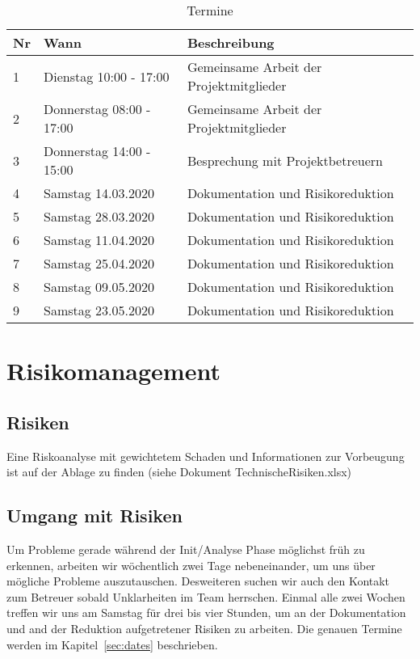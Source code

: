 \documentclass[
	ngerman,
	toc=listof, %
	toc=bibliography, %
	footnotes=multiple, %
	parskip=half, %
	numbers=noendperiod %
]{scrartcl}
\begin{document}
		\begin{table}[!h]
			\begin{tabularx}{0.9 \linewidth}{llX}
				\toprule
				Nr & Wann & Beschreibung \\
				\midrule
				1 & Dienstag 10:00 - 17:00 & Gemeinsame Arbeit der Projektmitglieder \\
				2 & Donnerstag 08:00 - 17:00 & Gemeinsame Arbeit der Projektmitglieder \\
				3 & Donnerstag 14:00 - 15:00 & Besprechung mit Projektbetreuern \\
				4 & Samstag 14.03.2020 & Dokumentation und Risikoreduktion\\
				5 & Samstag 28.03.2020 & Dokumentation und Risikoreduktion\\
				6 & Samstag 11.04.2020 & Dokumentation und Risikoreduktion\\
				7 & Samstag 25.04.2020 & Dokumentation und Risikoreduktion\\
				8 & Samstag 09.05.2020 & Dokumentation und Risikoreduktion\\
				9 & Samstag 23.05.2020 & Dokumentation und Risikoreduktion\\

				\bottomrule
			\end{tabularx}
			\caption{Termine}
		\end{table}
			

\section{Risikomanagement}
\label{sec:risikomanagement}

	\subsection{Risiken}
		Eine Riskoanalyse mit gewichtetem Schaden und Informationen zur Vorbeugung ist auf der Ablage zu
		finden (siehe Dokument TechnischeRisiken.xlsx)

	\subsection{Umgang mit Risiken}
		Um Probleme gerade während der Init/Analyse Phase möglichst früh zu erkennen, 
		arbeiten wir wöchentlich zwei Tage nebeneinander, um uns über mögliche Probleme auszutauschen. 
		Desweiteren suchen wir auch den Kontakt zum Betreuer sobald Unklarheiten im Team herrschen.
		Einmal alle zwei Wochen treffen wir uns am Samstag für drei bis vier Stunden, um an der Dokumentation und and der Reduktion aufgetretener Risiken zu arbeiten. Die genauen Termine werden im Kapitel~\ref{sec:dates} beschrieben.
\end{document}
